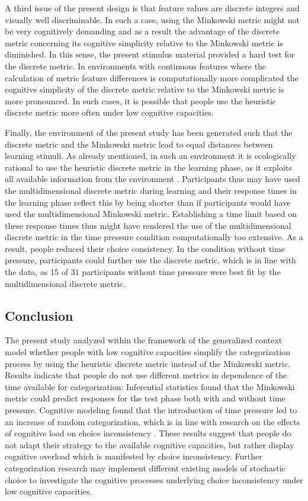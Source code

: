 \documentclass[a4paper,man,natbib]{apa6}
\begin{document}
A third issue of the present design is that feature values are discrete integers and visually well discriminable. In such a case, using the Minkowski metric might not be very cognitively demanding and as a result the advantage of the discrete metric concerning its cognitive simplicity relative to the Minkowski metric is diminished. In this sense, the present stimulus material provided a hard test for the discrete metric. In environments with continuous features where the calculation of metric feature differences is computationally more complicated the cognitive simplicity of the discrete metric relative to the Minkowski metric is more pronounced. In such cases, it is possible that people use the heuristic discrete metric more often under low cognitive capacities.

Finally, the environment of the present study has been generated such that the discrete metric and the Minkowski metric lead to equal distances between learning stimuli. As already mentioned, in such an environment it is ecologically rational to use the heuristic discrete metric in the learning phase, as it exploits all available information from the environment \citep{todd2007environments}. Participants thus may have used the multidimensional discrete metric during learning and their response times in the learning phase reflect this by being shorter than if participants would have used the multidimensional Minkowski metric. Establishing a time limit based on these response times thus might have rendered the use of the multidimensional discrete metric in the time pressure condition computationally too extensive. As a result, people reduced their choice consistency. In the condition without time pressure, participants could further use the discrete metric, which is in line with the data, as 15 of 31 participants without time pressure were best fit by the multidimensional discrete metric.

\subsection{Conclusion}
The present study analyzed within the framework of the generalized context model \citep{nosofsky1986attention} whether people with low cognitive capacities simplify the categorization process by using the heuristic discrete metric instead of the Minkowski metric. Results indicate that people do not use different metrics in dependence of the time available for categorization: Inferential statistics found that the Minkowski metric could predict responses for the test phase both with and without time pressure. Cognitive modeling found that the introduction of time pressure led to an increase of random categorization, which is in line with research on the effects of cognitive load on choice inconsistency \citep{olschewski2018taxing}. These results suggest that people do not adapt their strategy to the available cognitive capacities, but rather display cognitive overload which is manifested by choice inconsistency. Further categorization research may implement different existing models of stochastic choice \citep{blavatskyy2010models, becker1963stochastic} to investigate the cognitive processes underlying choice inconsistency under low cognitive capacities.
\end{document}
